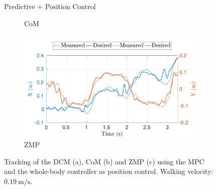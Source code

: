 \begin{figure}[t]
\begin{myframe}{Predictive + Position Control}
\begin{subfigure}[b]{0.49\textwidth}
        \caption{CoM}
        \label{fig:mpc_pos-min_vel-com}
    \end{subfigure}
         \begin{subfigure}[b]{0.49\textwidth}
        \centering
        \includegraphics[width=\textwidth]{chapter_simplified_benchmarking/figures/mpc_pos-min_vel-zmp.pdf}
        \caption{ZMP}
        \label{fig:mpc_pos-min_vel-zmp}
    \end{subfigure}
    \end{myframe}
    \caption{Tracking of the  DCM (a), CoM (b) and ZMP (c) using the MPC and the whole-body controller as position control. Walking velocity:  $\SI{0.19}{\meter \per \second}$.}
\end{figure}
